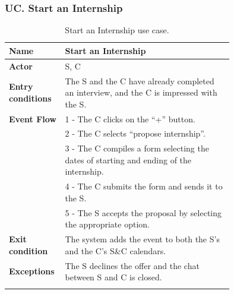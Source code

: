 \subsubsection*{UC\cuc . Start an Internship}
\begin{center}
    \begin{longtable}{|l|p{0.75\linewidth}|}
        \hline
        \textbf{Name}               & Start an Internship\\
        \hline
        \textbf{Actor}              & S, C\\
        \hline
        \textbf{Entry conditions}   & The S and the C have already completed an interview, and the C is impressed with the S.\\
        \hline
        \textbf{Event Flow}         & 1 - The C clicks on the “+” button. \\
        & 2 - The C selects “propose internship”. \\
        & 3 - The C compiles a form selecting the dates of starting and ending of the internship. \\
        & 4 - The C submits the form and sends it to the S. \\
        & 5 - The S accepts the proposal by selecting the appropriate option. \\
        \hline
        \textbf{Exit condition}   & The system adds the event to both the S’s and the C’s S\&C calendars. \\       
        \hline
        \textbf{Exceptions}       & The S declines the offer and the chat between S and C is closed. \\
        \hline
        \caption{Start an Internship use case.}
        \label{tab: start_internship_use_case}
    \end{longtable}
\end{center}


